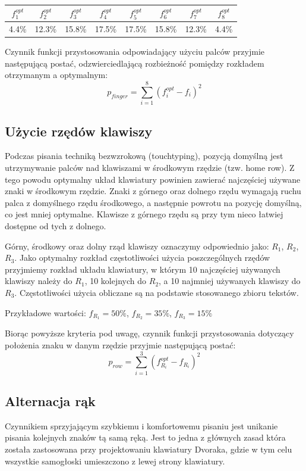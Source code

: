 \documentclass{xmgr}
\begin{document}
\begin{tabular}{ c | c | c | c | c | c | c | c }
  $f^{opt}_1$ & $f^{opt}_2$ & $f^{opt}_3$ & $f^{opt}_4$ & $f^{opt}_5$ & $f^{opt}_6$ & $f^{opt}_7$ & $f^{opt}_8$ \\
  \hline
  4.4\% & 12.3\% & 15.8\% & 17.5\% & 17.5\% & 15.8\% & 12.3\% & 4.4\% \\
\end{tabular}\newline

Czynnik funkcji przystosowania odpowiadający użyciu palców przyjmie następującą postać, odzwierciedlającą rozbieżność pomiędzy rozkładem otrzymanym a optymalnym:
$$ p_{finger} = \sum\limits_{i = 1}^{8} (f_i^{opt} - f_i)^2 $$


\subsection{Użycie rzędów klawiszy}

Podczas pisania techniką bezwzrokową (touchtyping), pozycją domyślną jest utrzymywanie palców nad klawiszami w środkowym rzędzie (tzw. home row). Z tego powodu optymalny układ klawiatury powinien zawierać najczęściej używane znaki w środkowym rzędzie. Znaki z górnego oraz dolnego rzędu wymagają ruchu palca z domyślnego rzędu środkowego, a następnie powrotu na pozycję domyślną, co jest mniej optymalne. Klawisze z górnego rzędu są przy tym nieco łatwiej dostępne od tych z dolnego.

Górny, środkowy oraz dolny rząd klawiszy oznaczymy odpowiednio jako: $R_1$, $R_2$, $R_3$. Jako optymalny rozkład częstotliwości użycia poszczególnych rzędów przyjmiemy rozkład układu klawiatury, w którym 10 najczęściej używanych klawiszy należy do $R_1$, 10 kolejnych do $R_2$, a 10 najmniej używanych klawiszy do $R_3$. Częstotliwości użycia obliczane są na podstawie stosowanego zbioru tekstów.

Przykładowe wartości: $f_{R_1} = 50\%$, $f_{R_2} = 35\%$, $f_{R_3} = 15\%$

Biorąc powyższe kryteria pod uwagę, czynnik funkcji przystosowania dotyczący położenia znaku w danym rzędzie przyjmie następującą postać:
$$ p_{row} = \sum\limits_{i = 1}^{3} (f_{R_i}^{opt} - f_{R_i})^2 $$


\subsection{Alternacja rąk}

Czynnikiem sprzyjającym szybkiemu i komfortowemu pisaniu jest unikanie pisania kolejnych znaków tą samą ręką. Jest to jedna z głównych zasad która została zastosowana przy projektowaniu klawiatury Dvoraka, gdzie w tym celu wszystkie samogłoski umieszczono z lewej strony klawiatury.
\end{document}
